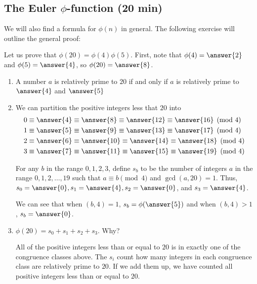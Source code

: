 \documentclass[letterpaper, 11 pt]{ximera}
\begin{document}
\subsection{The Euler $\phi$-function (20 min)}\label{sec-phi-start}

We will also find a formula for $\phi(n)$ in general. The following exercise will outline the general proof:

\begin{br}\label{br:multiplicative-proof}
  Let us prove that $\phi(20)=\phi(4)\phi(5)$. First, note that $\phi(4)=\answer{2}$ and $\phi(5)=\answer{4}$, so $\phi(20)=\answer{8}$.
  \begin{enumerate}
    \item A number $a$ is relatively prime to $20$ if and only if $a$ is relatively prime to $\answer{4}$ and $\answer{5}$ %
    
    \item  
    We can partition the positive integers less that $20$ into 
    \begin{align*}
      & 0\equiv\answer{4}\equiv\answer{8}\equiv\answer{12}\equiv\answer{16}\pmod 4\\
      & 1\equiv\answer{5}\equiv\answer{9}\equiv\answer{13}\equiv\answer{17}\pmod 4\\
      & 2\equiv\answer{6}\equiv\answer{10}\equiv\answer{14}\equiv\answer{18}\pmod 4\\
      & 3\equiv\answer{7}\equiv\answer{11}\equiv\answer{15}\equiv\answer{19}\pmod 4
    \end{align*}
 
    For any $b$ in the range $0,1,2,3$, define $s_b$ to be the number of integers $a$ in the range $0,1,2,\dots, 19$ such that $a\equiv b \pmod 4$ and $\gcd(a,20)=1$. Thus, $s_0=\answer{0}, s_1=\answer{4}, s_2=\answer{0}$, and $s_3=\answer{4}$.
 
    We can see that when $(b,4)=1$, $s_b=\phi(\answer{5})$ and when $(b,4)>1$, $s_b=\answer{0}$.
 
    \item $\phi(20)=s_0+s_1+s_2+s_3$. Why? 
 
    \begin{solution}
      All of the positive integers less than or equal to $20$ is in exactly one of the congruence classes above. The $s_i$ count how many integers in each congruence class are relatively prime to $20$. If we add them up, we have counted all positive integers less than or equal to $20$.
    \end{solution}
 

\end{enumerate}
\end{br}
\end{document}
